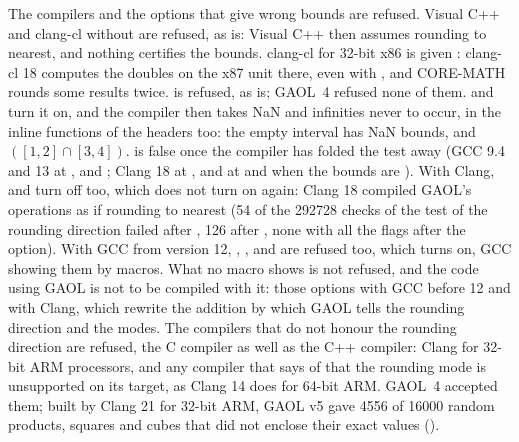 \medskip
The compilers and the options that give wrong bounds are
refused.\newinvfive{} Visual C++ and clang-cl without 
are refused, as  is: Visual C++ then assumes rounding to
nearest, and nothing certifies the bounds. clang-cl for 32-bit x86 is given
: clang-cl 18 computes the doubles on the x87 unit there,
even with , and CORE-MATH rounds some results twice.
 is refused, as  is; GAOL~4
refused none of them.  and  turn it on,
and the compiler then takes NaN and infinities never to occur, in the inline
functions of the headers too: the empty interval has NaN bounds, and
$([1, 2] \cap [3, 4])$. is false once the compiler has
folded the test away (GCC 9.4 and 13 at ,  and ; Clang 18 at
, and at  and  when the bounds are
). With Clang,  and  turn
 off too, which  does not turn
on again: Clang 18 compiled GAOL's operations as if rounding to nearest (54
of the 292728 checks of the test of the rounding direction failed after
, 126 after , none with all the flags after the option). With GCC from version 12,
, ,
 and  are refused too,
which  turns on, GCC showing them by
macros. What no macro shows is not refused, and the code using GAOL is not to
be compiled with it: those options with GCC before 12 and with Clang, which
rewrite the addition by which GAOL tells the rounding direction and the
modes. The compilers that do not honour the rounding direction are refused,
the C compiler as well as the C++ compiler: Clang for 32-bit ARM processors,
and any compiler that says of  that the rounding
mode is unsupported on its target, as Clang 14 does for 64-bit ARM. GAOL~4
accepted them; built by Clang 21 for 32-bit ARM, GAOL v5 gave 4556 of 16000
random products, squares and cubes that did not enclose their exact values
().

